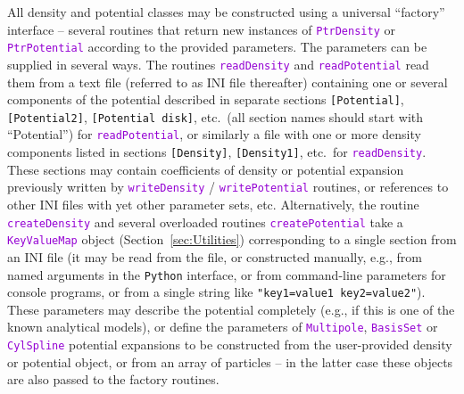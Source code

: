 \documentclass[12pt]{article}
\newcommand{\Python}{\texttt{Python}\xspace}
\newcommand{\ttt}[1]{\textcolor{darkviolet}{\texttt{#1}}}
\newcommand{\ppp}[1]{\textcolor{darkolive} {\texttt{#1}}}
\begin{document}
All density and potential classes may be constructed using a universal ``factory'' interface -- several routines that return new instances of \ttt{PtrDensity} or \ttt{PtrPotential} according to the provided parameters.
The parameters can be supplied in several ways. The routines \ttt{readDensity} and \ttt{readPotential} read them from a text file (referred to as INI file thereafter) containing one or several components of the potential described in separate sections \ppp{[Potential]}, \ppp{[Potential2]}, \ppp{[Potential disk]}, etc.\ (all section names should start with ``Potential'') for \ttt{readPotential}, or similarly a file with one or more density components listed in sections \ppp{[Density]}, \ppp{[Density1]}, etc.\ for \ttt{readDensity}. These sections may contain coefficients of density or potential expansion previously written by \ttt{writeDensity} / \ttt{writePotential} routines, or references to other INI files with yet other parameter sets, etc.
Alternatively, the routine \ttt{createDensity} and several overloaded routines \ttt{createPotential} take a \ttt{KeyValueMap} object (Section~\ref{sec:Utilities}) corresponding to a single section from an INI file (it may be read  from the file, or constructed manually, e.g., from named arguments in the \Python interface, or from command-line parameters for console programs, or from a single string like \ppp{"key1=value1 key2=value2"}). These parameters may describe the potential completely (e.g., if this is one of the known analytical models), or define the parameters of \ttt{Multipole}, \ttt{BasisSet} or \ttt{CylSpline} potential expansions to be constructed from the user-provided density or potential object, or from an array of particles -- in the latter case these objects are also passed to the factory routines. 
\end{document}
